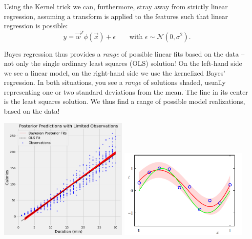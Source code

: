 \documentclass{article}
\begin{document}
Using the Kernel trick we can, furthermore, stray away from strictly linear regression, assuming a transform is applied to the features such that linear regression is possible:
\begin{equation}
    y = \vec{w}^T\phi(\vec{x})+\epsilon\quad\quad\text{with }\epsilon \sim \mathcal{N}(0,\sigma^2).
\end{equation}

\begin{testexample}
    Bayes regression thus provides a \textit{range} of possible linear fits based on the data -- not only the single ordinary least squares (OLS) solution! On the left-hand side we see a linear model, on the right-hand side we use the kernelized Bayes' regression. In both situations, you see a \textit{range} of solutions shaded, usually representing one or two standard deviations from the mean. The line in its center is the least squares solution. We thus find a range of possible model realizations, based on the data!
    \vspace{0.1cm}
    \begin{center}\includegraphics[width=0.48\textwidth]{bayeslinearregression.png} \includegraphics[width=0.48\textwidth]{bishop.png}\end{center}
\end{testexample}

\end{document}
